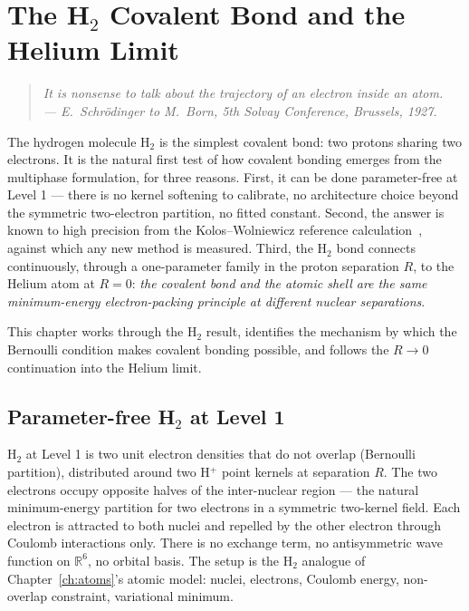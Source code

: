 \chapter{The H$_2$ Covalent Bond and the Helium Limit}\label{ch:h2}


\begin{quote}
\itshape It is nonsense to talk about the trajectory of an electron inside an atom.\\
\normalfont\hfill --- E.~Schr\"odinger to M.~Born, 5th Solvay Conference, Brussels, 1927.
\end{quote}
\bigskip

The hydrogen molecule H$_2$ is the simplest covalent bond: two protons sharing two electrons. It is the natural first test of how covalent bonding emerges from the multiphase formulation, for three reasons. First, it can be done parameter-free at Level 1 --- there is no kernel softening to calibrate, no architecture choice beyond the symmetric two-electron partition, no fitted constant. Second, the answer is known to high precision from the Kolos--Wolniewicz reference calculation~\cite{Kolos1968}, against which any new method is measured. Third, the H$_2$ bond connects continuously, through a one-parameter family in the proton separation $R$, to the Helium atom at $R = 0$: \emph{the covalent bond and the atomic shell are the same minimum-energy electron-packing principle at different nuclear separations}.

This chapter works through the H$_2$ result, identifies the mechanism by which the Bernoulli condition makes covalent bonding possible, and follows the $R \to 0$ continuation into the Helium limit.

\section{Parameter-free H$_2$ at Level 1}\label{sec:h2-level1}

H$_2$ at Level 1 is two unit electron densities that do not overlap (Bernoulli partition), distributed around two H$^+$ point kernels at separation $R$. The two electrons occupy opposite halves of the inter-nuclear region --- the natural minimum-energy partition for two electrons in a symmetric two-kernel field. Each electron is attracted to both nuclei and repelled by the other electron through Coulomb interactions only. There is no exchange term, no antisymmetric wave function on $\mathbb{R}^6$, no orbital basis. The setup is the H$_2$ analogue of Chapter~\ref{ch:atoms}'s atomic model: nuclei, electrons, Coulomb energy, non-overlap constraint, variational minimum.

